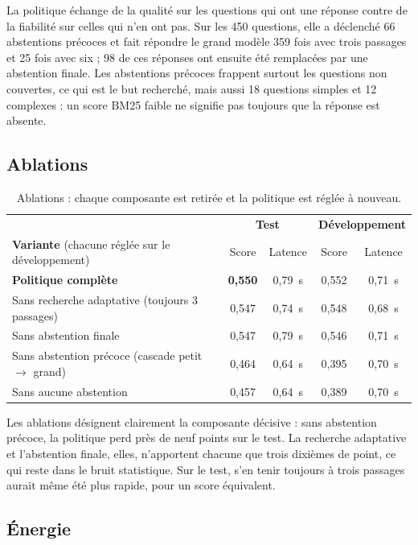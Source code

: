 \documentclass[11pt,a4paper]{article}
\begin{document}
La politique échange de la qualité sur les questions qui ont une réponse contre de la fiabilité sur
celles qui n'en ont pas. Sur les 450 questions, elle a déclenché 66 abstentions précoces et fait
répondre le grand modèle 359 fois avec trois passages et 25 fois avec six ; 98 de ces réponses ont
ensuite été remplacées par une abstention finale. Les abstentions précoces frappent surtout les
questions non couvertes, ce qui est le but recherché, mais aussi 18 questions simples et 12 complexes :
un score BM25 faible ne signifie pas toujours que la réponse est absente.

\subsection{Ablations}

\begin{table}[H]
\centering\small
\begin{tabular}{l c c c c}
\toprule
& \multicolumn{2}{c}{\textbf{Test}} & \multicolumn{2}{c}{\textbf{Développement}} \\
\textbf{Variante} (chacune réglée sur le développement) & Score & Latence & Score & Latence \\
\midrule
\textbf{Politique complète} & \textbf{0,550} & 0,79~s & 0,552 & 0,71~s \\
Sans recherche adaptative (toujours 3 passages) & 0,547 & 0,74~s & 0,548 & 0,68~s \\
Sans abstention finale & 0,547 & 0,79~s & 0,546 & 0,71~s \\
Sans abstention précoce (cascade petit $\to$ grand) & 0,464 & 0,64~s & 0,395 & 0,70~s \\
Sans aucune abstention & 0,457 & 0,64~s & 0,389 & 0,70~s \\
\bottomrule
\end{tabular}
\caption{Ablations : chaque composante est retirée et la politique est réglée à nouveau.}
\label{tab:ablations}
\end{table}

Les ablations désignent clairement la composante décisive : sans abstention précoce, la politique perd
près de neuf points sur le test. La recherche adaptative et l'abstention finale, elles, n'apportent
chacune que trois dixièmes de point, ce qui reste dans le bruit statistique. Sur le test, s'en tenir
toujours à trois passages aurait même été plus rapide, pour un score équivalent.

\subsection{Énergie}
\end{document}
